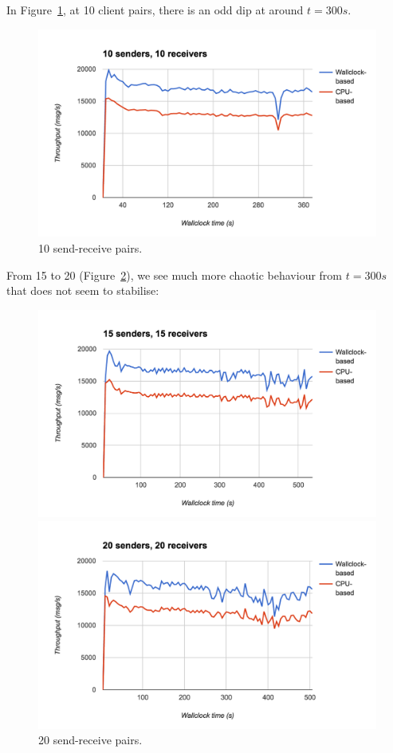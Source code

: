 \documentclass[12pt,a4paper,twoside,openright]{report}
\begin{document}
{In Figure~\ref{fig:10n10}, at 10 client pairs, there is an odd dip at around $t=300s$.
\begin{figure}
  \centering\includegraphics[width=\textwidth]{../transcripts/lipsum/10n10/10n10.png}
  \caption{10 send-receive pairs.}
  \label{fig:10n10}
\end{figure}

From 15 to 20 (Figure~\ref{fig:15n20}), we see much more chaotic behaviour from $t=300s$ that does not seem to stabilise:
\begin{figure}
  \centering\includegraphics[width=\textwidth]{../transcripts/lipsum/15n15/15n15.png}

  \centering\includegraphics[width=\textwidth]{../transcripts/lipsum/20n20/20n20.png}
  \caption{20 send-receive pairs.}
  \label{fig:15n20}
\end{figure}

}
\end{document}
